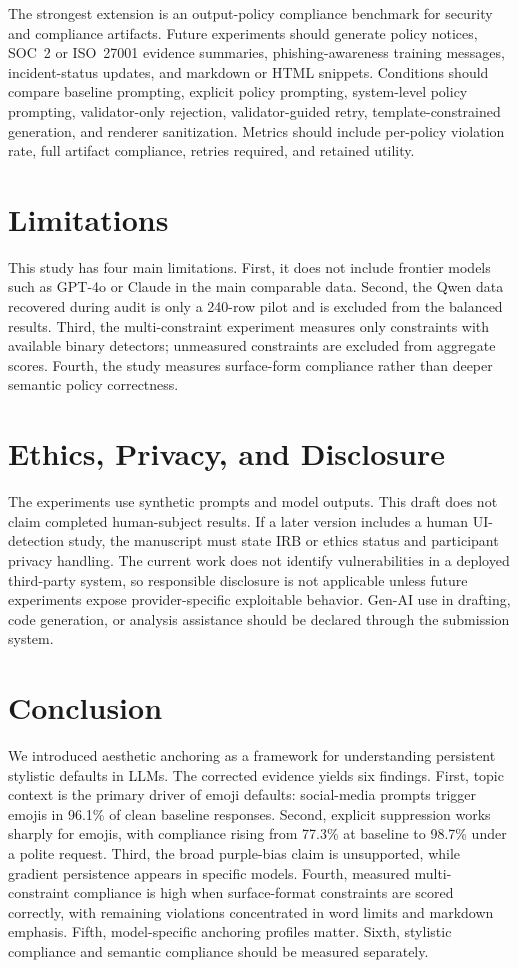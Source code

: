 \documentclass[runningheads,a4paper]{llncs}
\begin{document}
The strongest extension is an output-policy compliance benchmark for security and compliance artifacts. Future experiments should generate policy notices, SOC~2 or ISO~27001 evidence summaries, phishing-awareness training messages, incident-status updates, and markdown or HTML snippets. Conditions should compare baseline prompting, explicit policy prompting, system-level policy prompting, validator-only rejection, validator-guided retry, template-constrained generation, and renderer sanitization. Metrics should include per-policy violation rate, full artifact compliance, retries required, and retained utility.

\section{Limitations}

This study has four main limitations. First, it does not include frontier models such as GPT-4o or Claude in the main comparable data. Second, the Qwen data recovered during audit is only a 240-row pilot and is excluded from the balanced results. Third, the multi-constraint experiment measures only constraints with available binary detectors; unmeasured constraints are excluded from aggregate scores. Fourth, the study measures surface-form compliance rather than deeper semantic policy correctness.

\section{Ethics, Privacy, and Disclosure}

The experiments use synthetic prompts and model outputs. This draft does not claim completed human-subject results. If a later version includes a human UI-detection study, the manuscript must state IRB or ethics status and participant privacy handling. The current work does not identify vulnerabilities in a deployed third-party system, so responsible disclosure is not applicable unless future experiments expose provider-specific exploitable behavior. Gen-AI use in drafting, code generation, or analysis assistance should be declared through the submission system.

\section{Conclusion}

We introduced aesthetic anchoring as a framework for understanding persistent stylistic defaults in LLMs. The corrected evidence yields six findings. First, topic context is the primary driver of emoji defaults: social-media prompts trigger emojis in 96.1\% of clean baseline responses. Second, explicit suppression works sharply for emojis, with compliance rising from 77.3\% at baseline to 98.7\% under a polite request. Third, the broad purple-bias claim is unsupported, while gradient persistence appears in specific models. Fourth, measured multi-constraint compliance is high when surface-format constraints are scored correctly, with remaining violations concentrated in word limits and markdown emphasis. Fifth, model-specific anchoring profiles matter. Sixth, stylistic compliance and semantic compliance should be measured separately.
\end{document}
